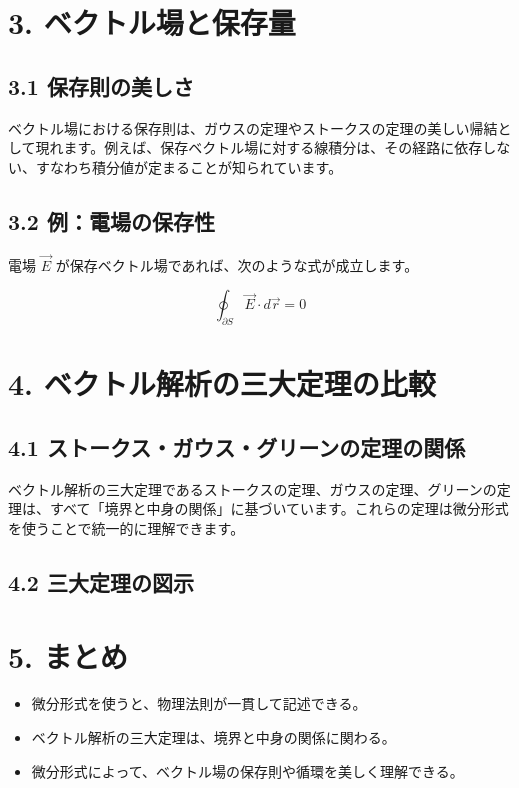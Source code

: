 \documentclass[a4j,11pt]{jsarticle}
\begin{document}
\section*{3. ベクトル場と保存量}

\subsection*{3.1 保存則の美しさ}
ベクトル場における保存則は、ガウスの定理やストークスの定理の美しい帰結として現れます。例えば、保存ベクトル場に対する線積分は、その経路に依存しない、すなわち積分値が定まることが知られています。

\subsection*{3.2 例：電場の保存性}
電場 $\vec{E}$ が保存ベクトル場であれば、次のような式が成立します。

\[
\oint_{\partial S} \vec{E} \cdot d\vec{r} = 0
\]

\section*{4. ベクトル解析の三大定理の比較}

\subsection*{4.1 ストークス・ガウス・グリーンの定理の関係}
ベクトル解析の三大定理であるストークスの定理、ガウスの定理、グリーンの定理は、すべて「境界と中身の関係」に基づいています。これらの定理は微分形式を使うことで統一的に理解できます。

\subsection*{4.2 三大定理の図示}
\begin{center}
\end{center}

\section*{5. まとめ}

\begin{itemize}
  \item 微分形式を使うと、物理法則が一貫して記述できる。
  \item ベクトル解析の三大定理は、境界と中身の関係に関わる。
  \item 微分形式によって、ベクトル場の保存則や循環を美しく理解できる。
\end{itemize}
\end{document}
